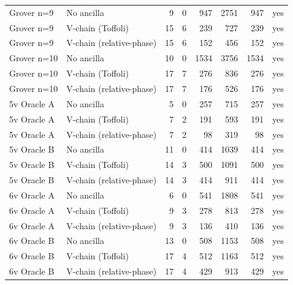 \begin{table}[t]
\begin{tabular}{llrrrrrr}
Grover n=9 & No ancilla & 9 & 0 & 947 & 2751 & 947 & yes \\
Grover n=9 & V-chain (Toffoli) & 15 & 6 & 239 & 727 & 239 & yes \\
Grover n=9 & V-chain (relative-phase) & 15 & 6 & 152 & 456 & 152 & yes \\
Grover n=10 & No ancilla & 10 & 0 & 1534 & 3756 & 1534 & yes \\
Grover n=10 & V-chain (Toffoli) & 17 & 7 & 276 & 836 & 276 & yes \\
Grover n=10 & V-chain (relative-phase) & 17 & 7 & 176 & 526 & 176 & yes \\
5v Oracle A & No ancilla & 5 & 0 & 257 & 715 & 257 & yes \\
5v Oracle A & V-chain (Toffoli) & 7 & 2 & 191 & 593 & 191 & yes \\
5v Oracle A & V-chain (relative-phase) & 7 & 2 & 98 & 319 & 98 & yes \\
5v Oracle B & No ancilla & 11 & 0 & 414 & 1039 & 414 & yes \\
5v Oracle B & V-chain (Toffoli) & 14 & 3 & 500 & 1091 & 500 & yes \\
5v Oracle B & V-chain (relative-phase) & 14 & 3 & 414 & 911 & 414 & yes \\
6v Oracle A & No ancilla & 6 & 0 & 541 & 1808 & 541 & yes \\
6v Oracle A & V-chain (Toffoli) & 9 & 3 & 278 & 813 & 278 & yes \\
6v Oracle A & V-chain (relative-phase) & 9 & 3 & 136 & 410 & 136 & yes \\
6v Oracle B & No ancilla & 13 & 0 & 508 & 1153 & 508 & yes \\
6v Oracle B & V-chain (Toffoli) & 17 & 4 & 512 & 1163 & 512 & yes \\
6v Oracle B & V-chain (relative-phase) & 17 & 4 & 429 & 913 & 429 & yes \\
\bottomrule
\end{tabular}
\end{table}
